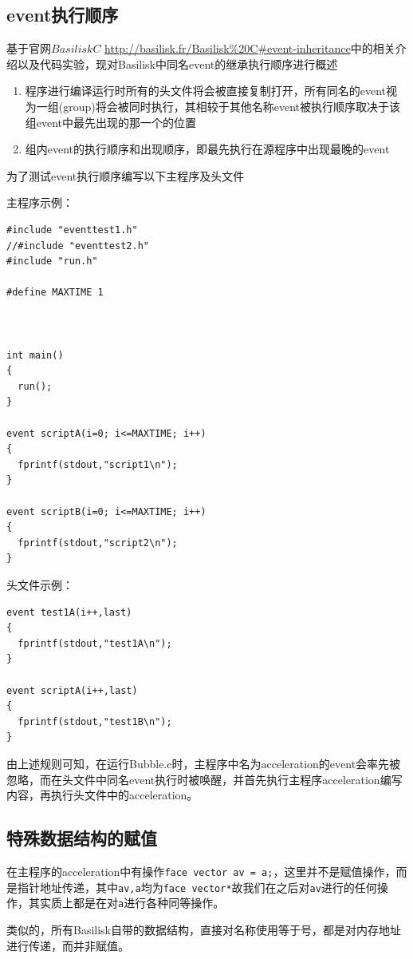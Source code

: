 \documentclass[lang=cn,11pt,a4paper]{elegantpaper}
\begin{document}
\subsection{event执行顺序}
基于官网$Basilisk C$ \url{http://basilisk.fr/Basilisk%20C#event-inheritance}中的相关介绍以及代码实验，现对Basilisk中同名event的继承执行顺序进行概述\par
\begin{enumerate}
    \item 程序进行编译运行时所有的头文件将会被直接复制打开，所有同名的event视为一组(group)将会被同时执行，其相较于其他名称event被执行顺序取决于该组event中最先出现的那一个的位置
    \item 组内event的执行顺序和出现顺序\textcolor{相反}，即最先执行在源程序中出现最晚的event
\end{enumerate}
为了测试event执行顺序编写以下主程序及头文件\par
主程序示例：
\begin{verbatim}
#include "eventtest1.h"
//#include "eventtest2.h"
#include "run.h"

#define MAXTIME 1



int main()
{
  run();
}

event scriptA(i=0; i<=MAXTIME; i++)
{
  fprintf(stdout,"script1\n");
}

event scriptB(i=0; i<=MAXTIME; i++)
{
  fprintf(stdout,"script2\n");
}
\end{verbatim}
头文件示例：
\begin{verbatim}
event test1A(i++,last)
{
  fprintf(stdout,"test1A\n");
}

event scriptA(i++,last)
{
  fprintf(stdout,"test1B\n");
}
\end{verbatim}
由上述规则可知，在运行Bubble.c时，主程序中名为acceleration的event会率先被忽略，而在头文件中同名event执行时被唤醒，并首先执行主程序acceleration编写内容，再执行头文件中的acceleration。
\subsection{特殊数据结构的赋值}
在主程序的acceleration中有操作\texttt{face vector av = a;}，这里并不是赋值操作，而是指针地址传递，其中\texttt{av,a}均为\texttt{face vector*}故我们在之后对\texttt{av}进行的任何操作，其实质上都是在对\texttt{a}进行各种同等操作。\par
类似的，所有Basilisk自带的数据结构，直接对名称使用等于号，都是对内存地址进行传递，而并非赋值。
\end{document}
